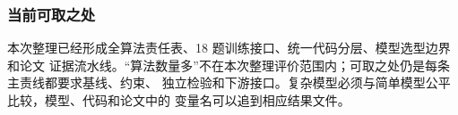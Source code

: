 \subsubsection{当前可取之处}

本次整理已经形成全算法责任表、18 题训练接口、统一代码分层、模型选型边界和论文
证据流水线。“算法数量多”不在本次整理评价范围内；可取之处仍是每条主责线都要求基线、约束、
独立检验和下游接口。复杂模型必须与简单模型公平比较，模型、代码和论文中的
变量名可以追到相应结果文件。

